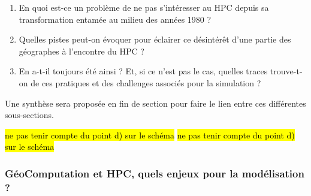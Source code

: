 \begin{enumerate}[label=(\alph*),labelindent=\parindent,leftmargin=*]
\item En quoi est-ce un problème de ne pas s'intéresser au HPC depuis sa transformation entamée au milieu des années 1980 ?
\item Quelles pistes peut-on évoquer pour éclairer ce désintérêt d'une partie des géographes à l'encontre du HPC ?
\item En a-t-il toujours été ainsi ? Et, si ce n'est pas le cas, quelles traces trouve-t-on de ces pratiques et des challenges associés pour la simulation ?
\end{enumerate}

Une synthèse sera proposée en fin de section pour faire le lien entre ces différentes sous-sections.

\hl{ne pas tenir compte du point d) sur le schéma}
\hl{ne pas tenir compte du point d) sur le schéma}



\subsubsection{GéoComputation et HPC, quels enjeux pour la modélisation ? }
\label{sssec:enjeuxHPC}

